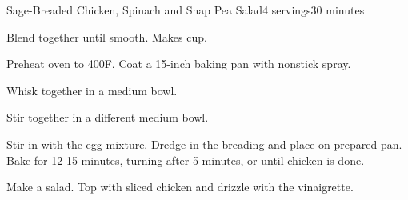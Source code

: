 \documentclass[../Cookbook.tex]{subfiles}
\begin{document}
\begin{recipe}{Sage-Breaded Chicken, Spinach and Snap Pea Salad}{4 servings}{30 minutes}

Blend together until smooth. Makes  cup.

Preheat oven to 400\0F. Coat a 15-inch baking pan with nonstick spray.

Whisk together in a medium bowl.

Stir together in a different medium bowl.

Stir in with the egg mixture. Dredge in the breading and place on prepared pan. Bake for 12-15 minutes, turning after 5 minutes, or until chicken is done.

Make a salad. Top with sliced chicken and drizzle with the vinaigrette.

\end{recipe}
\end{document}
